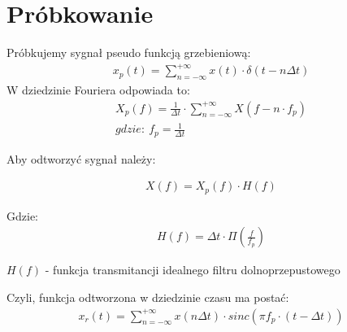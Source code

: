  \section{Próbkowanie}
    \tab Próbkujemy sygnał pseudo funkcją grzebieniową:
    \begin{gather*}
        x_p(t) = \sum_{n=-\infty}^{+\infty}x(t)\cdot \delta(t-n\Delta t)
    \end{gather*}
    W dziedzinie Fouriera odpowiada to:
    \begin{gather*}
        X_p(f) = \frac{1}{\Delta t} \cdot \sum_{n=-\infty}^{+\infty} X(f-n\cdot f_p)\\
        gdzie:\ f_p = \frac{1}{\Delta t}
    \end{gather*}

    Aby odtworzyć sygnał należy:
    \begin{multicols}{2}
        \begin{gather*}
            X(f) = X_p(f)\cdot H(f)
        \end{gather*}
        
        Gdzie:
        \begin{gather*}
            H(f) = \Delta t \cdot\Pi\left(\frac{f}{f_p}\right)
        \end{gather*}
    \end{multicols}
    \begin{center}
        $H(f)$ - funkcja transmitancji idealnego filtru dolnoprzepustowego
    \end{center}
    Czyli, funkcja odtworzona w dziedzinie czasu ma postać:
    \begin{gather*}
        x_r(t) = \sum_{n=-\infty}^{+\infty} x(n\Delta t) \cdot sinc(\pi f_p \cdot
        (t-\Delta t))
    \end{gather*}